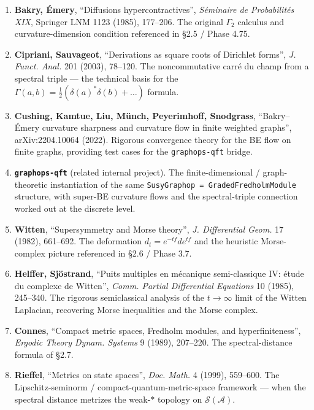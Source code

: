 \documentclass[
  11pt,
]{article}
\providecommand{\tightlist}{%
  \setlength{\itemsep}{0pt}\setlength{\parskip}{0pt}}
\begin{document}
\begin{enumerate}
  \begin{enumerate}
  \def\labelenumii{\arabic{enumii}.}
  \setcounter{enumii}{1988}
  \tightlist
  \item
    Chapters I--II for Clifford algebras, \(\mathrm{Spin}(n)\), spinor
    bundles and Dirac operators --- the bundle-theoretic input to Phase
    4a.
  \end{enumerate}
\item
  \textbf{Bakry, Émery}, ``Diffusions hypercontractives'',
  \emph{Séminaire de Probabilités XIX}, Springer LNM 1123 (1985),
  177--206. The original \(\Gamma_2\) calculus and curvature-dimension
  condition referenced in §2.5 / Phase 4.75.
\item
  \textbf{Cipriani, Sauvageot}, ``Derivations as square roots of
  Dirichlet forms'', \emph{J. Funct. Anal.} 201 (2003), 78--120. The
  noncommutative carré du champ from a spectral triple --- the technical
  basis for the
  \(\Gamma(a, b) = \tfrac{1}{2}(\delta(a)^*\delta(b) + \dots)\) formula.
\item
  \textbf{Cushing, Kamtue, Liu, Münch, Peyerimhoff, Snodgrass},
  ``Bakry--Émery curvature sharpness and curvature flow in finite
  weighted graphs'', arXiv:2204.10064 (2022). Rigorous convergence
  theory for the BE flow on finite graphs, providing test cases for the
  \texttt{graphops-qft} bridge.
\item
  \textbf{\texttt{graphops-qft}} (related internal project). The
  finite-dimensional / graph-theoretic instantiation of the same
  \texttt{SusyGraphop\ =\ GradedFredholmModule} structure, with super-BE
  curvature flows and the spectral-triple connection worked out at the
  discrete level.
\item
  \textbf{Witten}, ``Supersymmetry and Morse theory'', \emph{J.
  Differential Geom.} 17 (1982), 661--692. The deformation
  \(d_t = e^{-tf} d e^{tf}\) and the heuristic Morse-complex picture
  referenced in §2.6 / Phase 3.7.
\item
  \textbf{Helffer, Sjöstrand}, ``Puits multiples en mécanique
  semi-classique IV: étude du complexe de Witten'', \emph{Comm. Partial
  Differential Equations} 10 (1985), 245--340. The rigorous
  semiclassical analysis of the \(t \to \infty\) limit of the Witten
  Laplacian, recovering Morse inequalities and the Morse complex.
\item
  \textbf{Connes}, ``Compact metric spaces, Fredholm modules, and
  hyperfiniteness'', \emph{Ergodic Theory Dynam. Systems} 9 (1989),
  207--220. The spectral-distance formula of §2.7.
\item
  \textbf{Rieffel}, ``Metrics on state spaces'', \emph{Doc. Math.} 4
  (1999), 559--600. The Lipschitz-seminorm /
  compact-quantum-metric-space framework --- when the spectral distance
  metrizes the weak-\(*\) topology on \(\mathcal{S}(\mathcal{A})\).
\end{enumerate}
\end{document}
